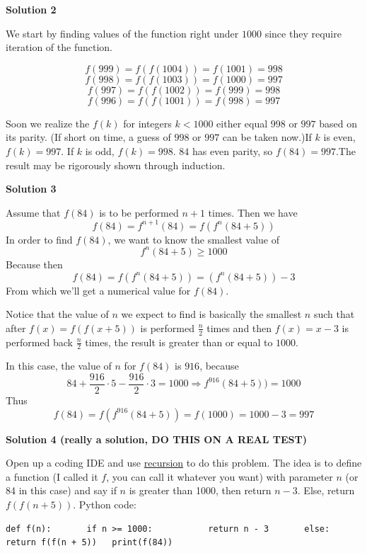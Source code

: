 \begin{enumerate}
 



\textbf{Solution 2}

We start by finding values of the function right under $1000$ since they require iteration of the function.

 
 \[f(999)=f(f(1004))=f(1001)=998\]
 \[f(998)=f(f(1003))=f(1000)=997\]
 \[f(997)=f(f(1002))=f(999)=998\]
 \[f(996)=f(f(1001))=f(998)=997\]

 Soon we realize the $f(k)$ for integers $k<1000$ either equal $998$ or $997$ based on its parity. (If short on time, a guess of $998$ or $997$ can be taken now.)If $k$ is even, $f(k)=997$. If $k$ is odd, $f(k)=998$. $84$ has even parity, so $f(84)=997$.The result may be rigorously shown through induction.

 



\textbf{Solution 3}

Assume that $f(84)$ is to be performed $n+1$ times. Then we have
 \[f(84)=f^{n+1}(84)=f(f^n(84+5))\]In order to find $f(84)$, we want to know the smallest value of
 \[f^n(84+5)\ge1000\]Because then
 \[f(84)=f(f^n(84+5))=(f^n(84+5))-3\]From which we'll get a numerical value for $f(84)$.

 Notice that the value of $n$ we expect to find is basically the smallest $n$ such that after $f(x)=f(f(x+5))$ is performed $\frac{n}{2}$ times and then $f(x)=x-3$ is performed back $\frac{n}{2}$ times, the result is greater than or equal to $1000$. 

 In this case, the value of $n$ for $f(84)$ is $916$, because
 \[84+\frac{916}{2}\cdot5-\frac{916}{2}\cdot3=1000\Longrightarrow f^{916}(84+5))=1000\]Thus
 \[f(84)=f(f^{916}(84+5))=f(1000)=1000-3=\boxed{997}\]




\textbf{Solution 4 (really a solution, DO THIS ON A REAL TEST)}

Open up a coding IDE and use \href{https://artofproblemsolving.com/wiki/index.php?title=Recursion}{recursion} to do this problem. The idea is to define a function (I called it $f$, you can call it whatever you want) with parameter $n$ (or 84 in this case) and say if $n$ is greater than 1000, then return $n-3$. Else, return $f(f(n + 5))$. Python code:

 \begin{verbatim}
def f(n):       if n >= 1000:           return n - 3       else:           return f(f(n + 5))   print(f(84))
\end{verbatim}



\end{enumerate}
